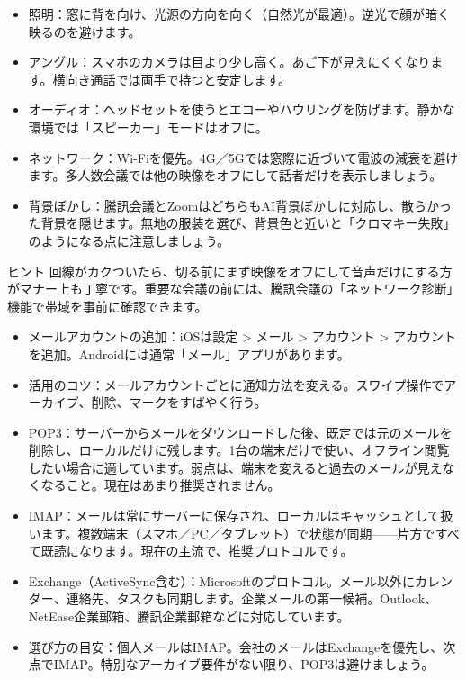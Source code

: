 \begin{itemize}
  \item 照明：窓に背を向け、光源の方向を向く（自然光が最適）。逆光で顔が暗く映るのを避けます。
  \item アングル：スマホのカメラは目より少し高く。あご下が見えにくくなります。横向き通話では両手で持つと安定します。
  \item オーディオ：ヘッドセットを使うとエコーやハウリングを防げます。静かな環境では「スピーカー」モードはオフに。
  \item ネットワーク：Wi-Fiを優先。4G／5Gでは窓際に近づいて電波の減衰を避けます。多人数会議では他の映像をオフにして話者だけを表示しましょう。
  \item 背景ぼかし：騰訊会議とZoomはどちらもAI背景ぼかしに対応し、散らかった背景を隠せます。無地の服装を選び、背景色と近いと「クロマキー失敗」のようになる点に注意しましょう。
\end{itemize}

\begin{tcbinfo}{ヒント}
回線がカクついたら、切る前にまず映像をオフにして音声だけにする方がマナー上も丁寧です。重要な会議の前には、騰訊会議の「ネットワーク診断」機能で帯域を事前に確認できます。

\end{tcbinfo}


\begin{itemize}
  \item メールアカウントの追加：iOSは設定 > メール > アカウント > アカウントを追加。Androidには通常「メール」アプリがあります。
  \item 活用のコツ：メールアカウントごとに通知方法を変える。スワイプ操作でアーカイブ、削除、マークをすばやく行う。
\end{itemize}


\begin{itemize}
  \item POP3：サーバーからメールをダウンロードした後、既定では元のメールを削除し、ローカルだけに残します。1台の端末だけで使い、オフライン閲覧したい場合に適しています。弱点は、端末を変えると過去のメールが見えなくなること。現在はあまり推奨されません。
  \item IMAP：メールは常にサーバーに保存され、ローカルはキャッシュとして扱います。複数端末（スマホ／PC／タブレット）で状態が同期——片方ですべて既読になります。現在の主流で、推奨プロトコルです。
  \item Exchange（ActiveSync含む）：Microsoftのプロトコル。メール以外にカレンダー、連絡先、タスクも同期します。企業メールの第一候補。Outlook、NetEase企業郵箱、騰訊企業郵箱などに対応しています。
  \item 選び方の目安：個人メールはIMAP。会社のメールはExchangeを優先し、次点でIMAP。特別なアーカイブ要件がない限り、POP3は避けましょう。
\end{itemize}

